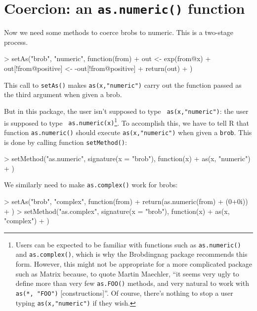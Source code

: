 \documentclass[a4paper]{article}
\begin{document}
\section{Coercion: an {\tt as.numeric()} function}

Now we need some methods to coerce brobs to numeric.  This is a
two-stage process.


\begin{Schunk}
\begin{Sinput}
> setAs("brob", "numeric", function(from) {
+     out <- exp(from@x)
+     out[!from@positive] <- -out[!from@positive]
+     return(out)
+ })
\end{Sinput}
\end{Schunk}

This call to {\tt setAs()} makes {\tt as(x,"numeric")} carry out the
function passed as the third argument when given a brob. 

But in this package, the user isn't supposed to type {\tt
as(x,"numeric")}: the user is supposed to type {\tt
as.numeric(x)}\footnote{Users can be expected to be familiar with
functions such as {\tt as.numeric()} and {\tt as.complex()}, which is
why the Brobdingnag package recommends this form.  However, this might
not be appropriate for a more complicated package such as Matrix
because, to quote Martin Maechler, ``it seems very ugly to define more
than very few {\tt as.FOO()} methods, and very natural to work with
{\tt as(*, "FOO")} [constructions]''.  Of course, there's nothing to
stop a user typing {\tt as(x,"numeric")} if they wish.}.  To
accomplish this, we have to tell R that function {\tt as.numeric()}
should execute {\tt as(x,"numeric")} when given a {\tt brob}.  This is
done by calling function {\tt setMethod()}:


\begin{Schunk}
\begin{Sinput}
> setMethod("as.numeric", signature(x = "brob"), function(x) {
+     as(x, "numeric")
+ })
\end{Sinput}
\end{Schunk}

We similarly need to make {\tt as.complex()} work for brobs:
\begin{Schunk}
\begin{Sinput}
> setAs("brob", "complex", function(from) {
+     return(as.numeric(from) + (0+0i))
+ })
> setMethod("as.complex", signature(x = "brob"), function(x) {
+     as(x, "complex")
+ })
\end{Sinput}
\end{Schunk}
\end{document}
